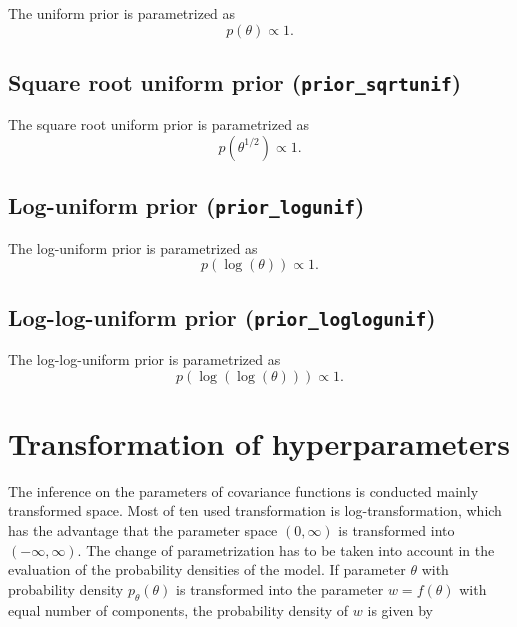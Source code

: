 \documentclass[twoside,11pt]{article}
\newcommand{\code}[1]{{\normalfont\texttt{#1}}}
\begin{document}
The uniform prior is parametrized as
\begin{equation}
p(\theta)\propto 1.
\end{equation}

\subsection*{Square root uniform prior (\code{prior\_sqrtunif})}

The square root uniform prior is parametrized as
\begin{equation}
p(\theta^{1/2})\propto 1.
\end{equation}

\subsection*{Log-uniform prior (\code{prior\_logunif})}

The log-uniform prior is parametrized as
\begin{equation}
p(\log(\theta))\propto 1.
\end{equation}

\subsection*{Log-log-uniform prior (\code{prior\_loglogunif})}

The log-log-uniform prior is parametrized as
\begin{equation}
p(\log(\log(\theta)))\propto 1.
\end{equation} 

\section{Transformation of hyperparameters}
\label{sec_log_transformation}

The inference on the parameters of covariance functions is
conducted mainly transformed space. Most of ten used transformation
is log-transformation, which has the advantage that the parameter
space $(0,\infty)$ is transformed into $(-\infty,\infty)$. The
change of parametrization has to be taken into account in the
evaluation of the probability densities of the model. If parameter
$\theta$ with probability density $p_{\theta}(\theta)$ is
transformed into the parameter $w = f(\theta)$ with equal number of
components, the probability density of $w$ is given by
\end{document}
